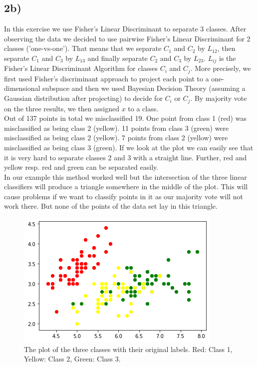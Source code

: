 \subsection*{2b)}
In this exercise we use Fisher's Linear Discriminant to separate 3 classes. After observing the data we decided to use pairwise Fisher's Linear Discriminant for 2 classes ('one-vs-one'). That means that we separate $C_1$ and $C_2$ by $L_{12}$, then separate $C_1$ and $C_3$ by $L_{13}$ and finally separate $C_2$ and $C_3$ by $L_{23}$. $L_{ij}$ is the Fisher's Linear Discriminant Algorithm for classes $C_i$ and $C_j$. More precisely, we first used Fisher's discriminant approach to project each point to a one-dimensional subspace and then we used Bayesian Decision Theory (assuming a Gaussian distribution after projecting) to decide for $C_i$ or $C_j$. By majority vote on the three results, we then assigned $x$ to a class. 
\\
Out of 137 points in total we misclassified 19. One point from class 1 (red) was misclassified as being class 2 (yellow). 11 points from class 3 (green) were misclassified as being class 2 (yellow). 7 points from class 2 (yellow) were misclassified as being class 3 (green). If we look at the plot we can easily see that it is very hard to separate classes 2 and 3 with a straight line.  Further, red and yellow resp. red and green can be separated easily.  \\
In our example this method worked well but the intersection of the three linear classifiers will produce a triangle somewhere in the middle of the plot. This will cause problems if we want to classify points in it as our majority vote will not work there. But none of the points of the data set lay in this triangle. 
\begin{figure}
	\centering
	\includegraphics{Figure_2b_orig.png}
	\caption{The plot of the three classes with their original labels. Red: Class 1, Yellow: Class 2, Green: Class 3.}
	\label{fig:2b-Plot1}
\end{figure} 
